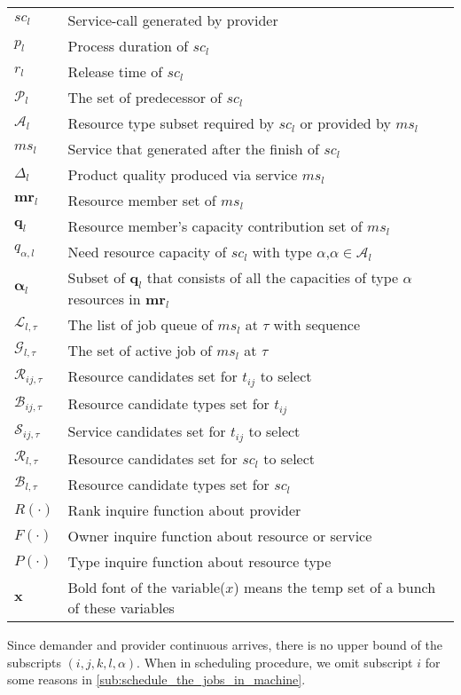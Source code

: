 \begin{table}[htbp]
\begin{tabularx}{\textwidth}{|lX|}
	$sc_l$ & Service-call generated by provider\\
	$p_l$ & Process duration of $sc_l$\\
	$r_l$ & Release time of $sc_l$\\
	$\mathcal{P}_{l}$ & The set of predecessor of $sc_{l}$\\
	$\mathcal{A}_l$ & Resource type subset required by $sc_l$ or provided by $ms_l$ \\ %
	$ms_l$ & Service that generated after the finish of $sc_l$\\
	$\Delta_l$ & Product quality produced via service $ms_l$\\
	$\bm{mr}_l$ & Resource member set of $ms_l$\\
	$\bm{q}_l$ & Resource member's capacity contribution set of $ms_l$\\
	$q_{\alpha,l}$ & Need resource capacity of $sc_l$ with type $\alpha$,$\alpha\in\mathcal{A}_{l}$\\
	$\bm{\alpha}_l$ & Subset of $\bm{q}_l$ that consists of all the capacities of type $\alpha$ resources in $\bm{mr}_l$\\
	$\mathcal{L}_{l,\tau}$ & The list of job queue of $ms_l$ at $\tau$ with sequence\\
	$\mathcal{G}_{l,\tau}$ & The set of active job of $ms_l$ at $\tau$ \\
	$\mathcal{R}_{ij,\tau}$ & Resource candidates set for $t_{ij}$ to select\\
	$\mathcal{B}_{ij,\tau}$ & Resource candidate types set for $t_{ij}$\\
	$\mathcal{S}_{ij,\tau}$ & Service candidates set for $t_{ij}$ to select\\
	$\mathcal{R}_{l,\tau}$ & Resource candidates set for $sc_l$ to select\\
	$\mathcal{B}_{l,\tau}$ & Resource candidate types set for $sc_l$\\
	$R(\cdot)$ & Rank inquire function about provider\\
	$F(\cdot)$ & Owner inquire function about resource or service\\
	$P(\cdot)$ & Type inquire function about resource type\\
	$\bm{x}$ & Bold font of the variable($x$) means the temp set of a bunch of these variables\\
    \hline
\end{tabularx}
\end{table}
Since demander and provider continuous arrives, there is no upper bound of the subscripts
$(i,j,k,l,\alpha)$. When in scheduling procedure, we omit subscript $i$ for some reasons in \autoref{sub:schedule_the_jobs_in_machine}.
